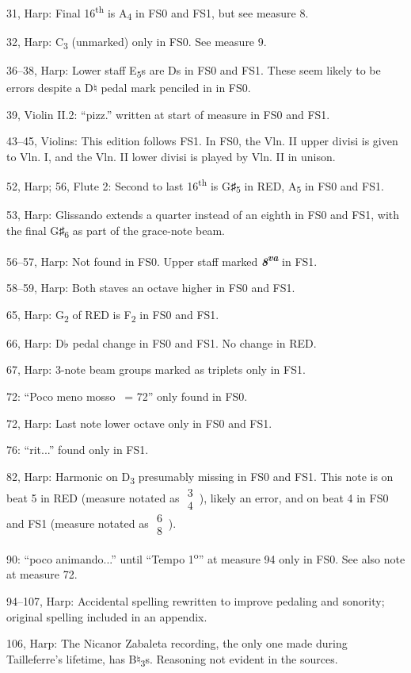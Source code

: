 \documentclass[twoside]{article}
\begin{document}
\begin{hangparas}{15pt}{1}
\begin{multicols}{2}
31, Harp: Final 16\textsuperscript{th} is A\textsubscript{4} in FS0 and FS1, but see measure 8.

32, Harp: C\textsubscript{3} (unmarked) only in FS0. See measure 9.

36--38, Harp: Lower staff E\textsubscript{5}s are Ds in FS0 and FS1. These seem likely to be errors despite a D♮ pedal mark penciled in in FS0.

39, Violin II.2: ``pizz.'' written at start of measure in FS0 and FS1.

43--45, Violins: This edition follows FS1. In FS0, the Vln. II upper divisi is given to Vln. I, and the Vln. II lower divisi is played by Vln. II in unison.

52, Harp; 56, Flute 2: Second to last 16\textsuperscript{th} is G♯\textsubscript{5} in RED, A\textsubscript{5} in FS0 and FS1.

53, Harp: Glissando extends a quarter instead of an eighth in FS0 and FS1, with the final G♯\textsubscript{6} as part of the grace-note beam.

56--57, Harp: Not found in FS0. Upper staff marked \textit{\textbf{8\textsuperscript{va}}} in FS1.

58--59, Harp: Both staves an octave higher in FS0 and FS1.

65, Harp: G\textsubscript{2} of RED is F\textsubscript{2} in FS0 and FS1.

66, Harp: D♭ pedal change in FS0 and FS1. No change in RED.

67, Harp: 3-note beam groups marked as triplets only in FS1.

72: ``Poco meno mosso \Vier\ = 72'' only found in FS0.

72, Harp: Last note lower octave only in FS0 and FS1.

76: ``rit...'' found only in FS1.

82, Harp: Harmonic on D\textsubscript{3} presumably missing in FS0 and FS1. This note is on beat 5 in RED (measure notated as $\substack{3\\4}$\,), likely an error, and on beat 4 in FS0 and FS1 (measure notated as $\substack{6\\8}$\,).

90: ``poco animando...'' until ``Tempo 1\textsuperscript{o}'' at measure 94 only in FS0. See also note at measure 72.

94--107, Harp: Accidental spelling rewritten to improve pedaling and sonority; original spelling included in an appendix.

106, Harp: The Nicanor Zabaleta recording, the only one made during Tailleferre's lifetime, has B♮\textsubscript{3}s. Reasoning not evident in the sources.


\end{multicols}
\end{hangparas}
\end{document}

